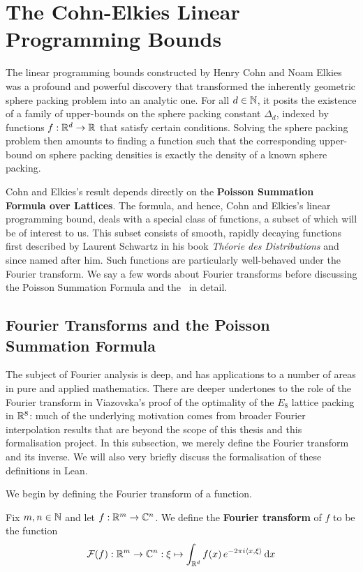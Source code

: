 \section{The Cohn-Elkies Linear Programming Bounds}\label{Ch2:Sec:CohnElkies}

The linear programming bounds constructed by Henry Cohn and Noam Elkies was a profound and powerful discovery that transformed the inherently geometric sphere packing problem into an analytic one. For all $d \in \mathbb{N}$, it posits the existence of a family of upper-bounds on the sphere packing constant $\Delta_d$, indexed by functions $f : \mathbb{R}^d \to \mathbb{R}$ that satisfy certain conditions. Solving the sphere packing problem then amounts to finding a function such that the corresponding upper-bound on sphere packing densities is exactly the density of a known sphere packing.

Cohn and Elkies's result depends directly on the \textbf{Poisson Summation Formula over Lattices}. The formula, and hence, Cohn and Elkies's linear programming bound, deals with a special class of functions, a subset of which will be of interest to us. This subset consists of smooth, rapidly decaying functions first described by Laurent Schwartz in his book \textit{Théorie des Distributions} \cite[Ch VII, \S 3]{SchwartzDistrib} and since named after him. Such functions are particularly well-behaved under the Fourier transform. We say a few words about Fourier transforms before discussing the Poisson Summation Formula and the \CELP\ in detail.

\subsection{Fourier Transforms and the Poisson Summation Formula}

The subject of Fourier analysis is deep, and has applications to a number of areas in pure and applied mathematics. There are deeper undertones to the role of the Fourier transform in Viazovska's proof of the optimality of the $E_8$ lattice packing in $\mathbb{R}^8$: much of the underlying motivation comes from broader Fourier interpolation results that are beyond the scope of this thesis and this formalisation project. In this subsection, we merely define the Fourier transform and its inverse. We will also very briefly discuss the formalisation of these definitions in Lean.

We begin by defining the Fourier transform of a function.

\begin{boxdefinition}\label{Ch2:Def:Fourier_Transform}
    Fix $m, n \in \mathbb{N}$ and let $f : \mathbb{R}^m \to \mathbb{C}^n$. We define the \textbf{Fourier transform} of $f$ to be the function
    \begin{align*}
        \mathcal{F}(f) : \mathbb{R}^m \to \mathbb{C}^n : \xi \mapsto \int_{\mathbb{R}^d} f\!\left( x \right) e^{-2 \pi i \left\langle x, \xi \right\rangle} \operatorname{d}\!x
    \end{align*}
\end{boxdefinition}

